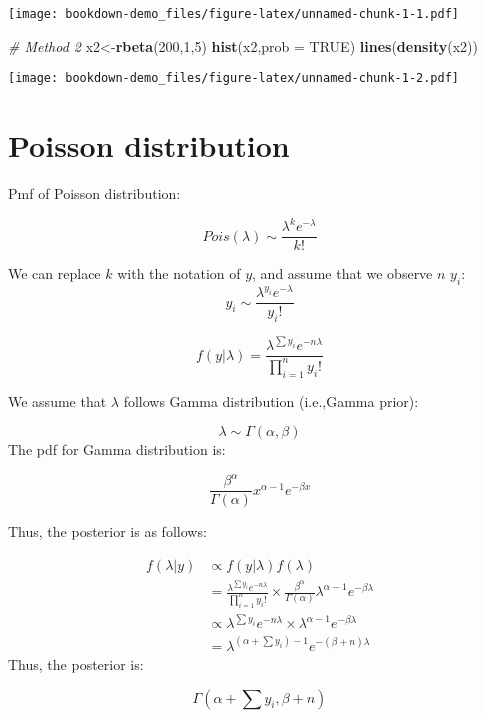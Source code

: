 \documentclass[]{book}
\newenvironment{Shaded}{\begin{snugshade}}{\end{snugshade}}
\newcommand{\KeywordTok}[1]{\textcolor[rgb]{0.13,0.29,0.53}{\textbf{#1}}}
\newcommand{\DataTypeTok}[1]{\textcolor[rgb]{0.13,0.29,0.53}{#1}}
\newcommand{\DecValTok}[1]{\textcolor[rgb]{0.00,0.00,0.81}{#1}}
\newcommand{\CommentTok}[1]{\textcolor[rgb]{0.56,0.35,0.01}{\textit{#1}}}
\newcommand{\OtherTok}[1]{\textcolor[rgb]{0.56,0.35,0.01}{#1}}
\newcommand{\NormalTok}[1]{#1}
\begin{document}
\texttt{[image: bookdown-demo\_files/figure-latex/unnamed-chunk-1-1.pdf]}

\begin{Shaded}
\begin{Highlighting}[]
\CommentTok{# Method 2}
\NormalTok{x2<-}\KeywordTok{rbeta}\NormalTok{(}\DecValTok{200}\NormalTok{,}\DecValTok{1}\NormalTok{,}\DecValTok{5}\NormalTok{)}
\KeywordTok{hist}\NormalTok{(x2,}\DataTypeTok{prob =} \OtherTok{TRUE}\NormalTok{)}
\KeywordTok{lines}\NormalTok{(}\KeywordTok{density}\NormalTok{(x2))}
\end{Highlighting}
\end{Shaded}

\texttt{[image: bookdown-demo\_files/figure-latex/unnamed-chunk-1-2.pdf]}

\section{Poisson distribution}\label{poisson-distribution}

Pmf of Poisson distribution:

\[Pois (\lambda) \sim \frac{\lambda^k e^{-\lambda}}{k!}\]

We can replace \(k\) with the notation of \(y\), and assume that we
observe \(n\) \(y_i\):
\[y_i \sim \frac{\lambda^{y_i} e^{-\lambda}}{y_i!}\]

\[f(y|\lambda)=\frac{\lambda^{\sum y_i} e^{- n \lambda}}{\prod_{i=1}^n y_i !}\]

We assume that \(\lambda\) follows Gamma distribution (i.e.,Gamma
prior):

\[\lambda \sim \Gamma(\alpha, \beta)\] The pdf for Gamma distribution
is:

\[\frac{\beta^{\alpha}}{\Gamma(\alpha)}x^{\alpha-1}e^{-\beta x}\]

Thus, the posterior is as follows:

\[\begin{aligned} f(\lambda | y) &\propto f(y|\lambda)f(\lambda) \\ &=\frac{\lambda^{\sum y_i} e^{- n \lambda}}{\prod_{i=1}^n y_i !} \times \frac{\beta^{\alpha}}{\Gamma(\alpha)}\lambda^{\alpha-1}e^{-\beta \lambda} \\ &\propto \lambda^{\sum y_i}e^{- n \lambda} \times \lambda^{\alpha-1}e^{-\beta \lambda} \\ &=\lambda^{(\alpha+\sum y_i)-1}e^{- (\beta+n) \lambda} \end{aligned}\]
Thus, the posterior is:

\[\Gamma(\alpha + \sum y_i, \beta+n)\]
\end{document}
